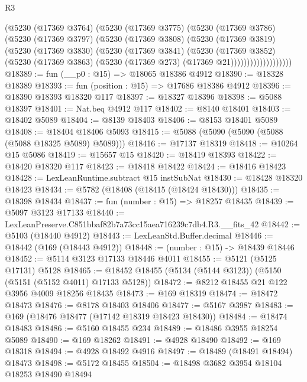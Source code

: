 \begin{lexlean}{R3}
\begin{coremodule}
                  (@5230
                    (@17369 @3764)
                    (@5230
                      (@17369 @3775)
                      (@5230
                        (@17369 @3786)
                        (@5230
                          (@17369 @3797)
                          (@5230
                            (@17369 @3808)
                            (@5230
                              (@17369 @3819)
                              (@5230
                                (@17369 @3830)
                                (@5230
                                  (@17369 @3841)
                                  (@5230
                                    (@17369 @3852)
                                    (@5230
                                      (@17369 @3863)
                                      (@5230 (@17369 @273) (@17369 @21)))))))))))))))))))
@18389 := fun (__p0 : @15) => @18065 @18386 @4912
@18390 := @18328 @18389
@18393 := fun (position : @15) => @17686 @18386 @4912
@18396 := @18390 @18393 @18320 @117
@18397 := @18327 @18396
@18398 := @5088 @18397
@18401 := Nat.beq @4912 @117
@18402 := @8140 @18401
@18403 := @18402 @5089
@18404 := @8139 @18403
@18406 := @8153 @18401 @5089
@18408 := @18404 @18406 @5093
@18415 := @5088 (@5090 (@5090 (@5088 (@5088 @18325 @5089) @5089)))
@18416 := @17137 @18319
@18418 := @10264 @15 @5086
@18419 := @15657 @15
@18420 := @18419 @18393
@18422 := @18420 @18320 @117
@18423 := @18418 @18422
@18424 := @18416 @18423
@18428 := LexLeanRuntime.subtract @15 instSubNat
@18430 := @18428 @18320 @18423
@18434 := @5782 (@18408 (@18415 (@18424 @18430)))
@18435 := @18398 @18434
@18437 := fun (number : @15) => @18257 @18435
@18439 := @5097 @3123 @17133
@18440 := LexLeanPreserve.C851bbaf82b7a73cc15aea716239c7db4.R3.__fits_42
@18442 := @5103 (@18440 @4912)
@18443 := LexLeanStd.Buffer.decimal
@18446 := @18442 (@169 (@18443 @4912))
@18448 := (number : @15) -> @18439 @18446
@18452 := @5114 @3123 @17133 @18446 @4011
@18455 := @5121 (@5125 @17131) @5128
@18465 := @18452 @18455 (@5134 (@5144 @3123)) (@5150 (@5151 (@5152 @4011) @17133 @5128))
@18472 := @8212 @18455 @21 @122 @3956 @4009 @18256 @18435
@18473 := @169 @18319
@18474 := @18472 @18473
@18476 := @8178 @18403 @18406
@18477 := @5167 @3987
@18483 := @169 (@18476 @18477 (@17142 @18319 @18423 @18430))
@18484 := @18474 @18483
@18486 := @5160 @18455 @234
@18489 := @18486 @3955 @18254 @5089
@18490 := @169 @18262
@18491 := @4928 @18490
@18492 := @169 @18318
@18494 := @4928 @18492 @4916
@18497 := @18489 (@18491 @18494) @18473
@18498 := @5172 @18455
@18504 := @18498 @3682 @3954 @18104 @18253 @18490 @18494

\end{coremodule}
\end{lexlean}
